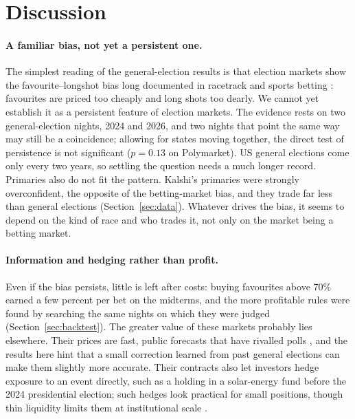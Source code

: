 \section{Discussion}\label{sec:discussion}

\paragraph{A familiar bias, not yet a persistent one.} The simplest reading of the general-election results is that
election markets show the favourite--longshot bias long documented in racetrack and sports betting
\citep{griffith1949,thaler1988,snowberg2010}: favourites are priced too cheaply and long shots too dearly. We cannot yet
establish it as a persistent feature of election markets. The evidence rests on two general-election nights, 2024 and
2026, and two nights that point the same way may still be a coincidence; allowing for states moving together, the
direct test of persistence is not significant ($p = 0.13$ on Polymarket). US general elections come only every two
years, so settling the question needs a much longer record. Primaries also do not fit the pattern. Kalshi's primaries
were strongly overconfident, the opposite of the betting-market bias, and they trade far less than general elections
(Section~\ref{sec:data}). Whatever drives the bias, it seems to depend on the kind of race and who trades it, not only
on the market being a betting market.

\paragraph{Information and hedging rather than profit.} Even if the bias persists, little is left after costs: buying
favourites above 70\% earned a few percent per bet on the midterms, and the more profitable rules were found by
searching the same nights on which they were judged (Section~\ref{sec:backtest}). The greater value of these markets
probably lies elsewhere. Their prices are fast, public forecasts that have rivalled polls
\citep{berg2008,rothschild2009}, and the results here hint that a small correction learned from past general elections can make
them slightly more accurate. Their contracts also let investors hedge exposure to an event directly, such as a holding in a solar-energy
fund before the 2024 presidential election; such hedges look practical for small positions, though thin liquidity
limits them at institutional scale \citep{kirillov2026hedge}.

